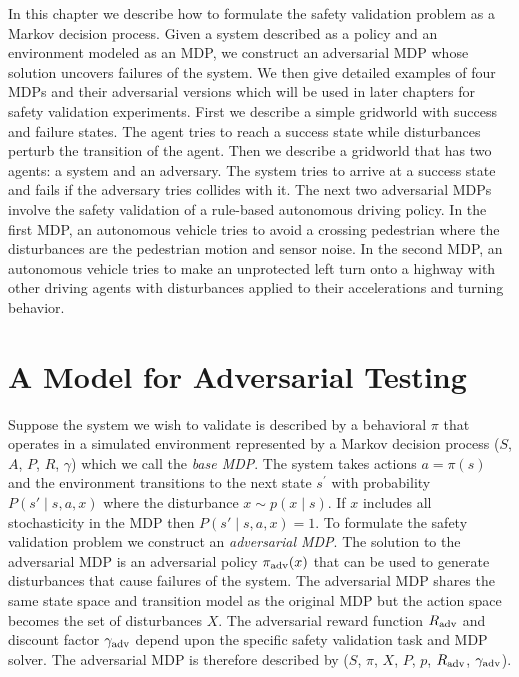 
In this chapter we describe how to formulate the safety validation problem as a Markov decision process.  Given a system described as a policy and an environment modeled as an MDP, we construct an adversarial MDP whose solution uncovers failures of the system. We then give detailed examples of four MDPs and their adversarial versions which will be used in later chapters for safety validation experiments. First we describe a simple gridworld with success and failure states. The agent tries to reach a success state while disturbances perturb the transition of the agent. Then we describe a gridworld that has two agents: a system and an adversary. The system tries to arrive at a success state  and fails if the adversary tries collides with it. The next two adversarial MDPs involve the safety validation of a rule-based autonomous driving policy. In the first MDP, an autonomous vehicle tries to avoid a crossing pedestrian where the disturbances are the pedestrian motion and sensor noise. In the second MDP, an autonomous vehicle tries to make an unprotected left turn onto a highway with other driving agents with disturbances applied to their accelerations and turning behavior.

\section{A Model for Adversarial Testing}

Suppose the system we wish to validate is described by a behavioral $\pi$ that operates in a simulated environment represented by a Markov decision process ($S$, $A$, $P$, $R$, $\gamma$) which we call the \emph{base MDP}. The system takes actions $a = \pi(s)$ and the environment transitions to the next state $s^\prime$ with probability $P(s' \mid s, a, x)$ where the disturbance $x \sim p(x \mid s)$. If $x$ includes all stochasticity in the MDP then $P(s' \mid s, a, x) = 1$. To formulate the safety validation problem we construct an \emph{adversarial MDP}. The solution to the adversarial MDP is an adversarial policy $\pi_{\rm adv}(x)$ that can be used to generate disturbances that cause failures of the system. The adversarial MDP shares the same state space and transition model as the original MDP but the action space becomes the set of disturbances $X$. The adversarial reward function $R_{\rm adv}$ and discount factor $\gamma_{\rm adv}$ depend upon the specific safety validation task and MDP solver. The adversarial MDP is therefore described by ($S$, $\pi$, $X$, $P$, $p$, $R_{\rm adv}$, $\gamma_{\rm adv}$).

